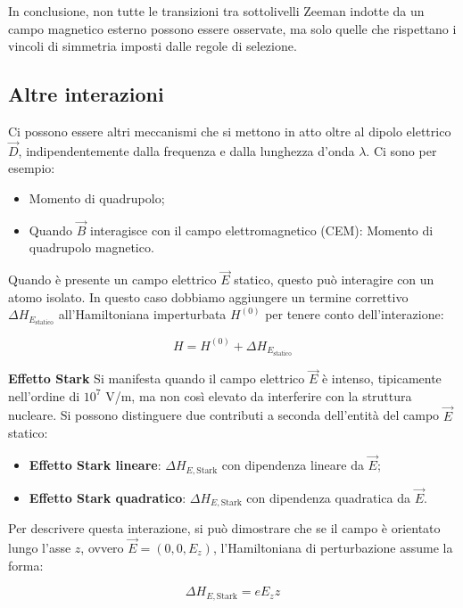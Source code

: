 In conclusione, non tutte le transizioni tra sottolivelli Zeeman indotte da un campo magnetico esterno possono essere osservate, ma solo quelle che rispettano i vincoli di simmetria imposti dalle regole di selezione.

\subsection{Altre interazioni}
Ci possono essere altri meccanismi che si mettono in atto oltre al dipolo elettrico \(\vec{D}\), indipendentemente dalla frequenza e dalla lunghezza d'onda \(\lambda\). Ci sono per esempio:
\begin{itemize}
    \item Momento di quadrupolo;
    \item Quando \(\vec{B}\) interagisce con il campo elettromagnetico (CEM): Momento di quadrupolo magnetico.
\end{itemize}

Quando è presente un campo elettrico \(\vec{E}\) statico, questo può interagire con un atomo isolato. In questo caso dobbiamo aggiungere un termine correttivo \(\Delta H_{E_{\text{statico}}}\) all'Hamiltoniana imperturbata \(H^{(0)}\) per tenere conto dell'interazione:

\begin{equation}
    H = H^{(0)} + \Delta H_{E_{\text{statico}}}
\end{equation}

\textbf{Effetto Stark}
Si manifesta quando il campo elettrico \(\vec{E}\) è intenso, tipicamente nell'ordine di \(10^7\) V/m, ma non così elevato da interferire con la struttura nucleare. Si possono distinguere due contributi a seconda dell'entità del campo \(\vec{E}\) statico:

\begin{itemize}
    \item \textbf{Effetto Stark lineare}: \(\Delta H_{E, \text{Stark}}\) con dipendenza lineare da \(\vec{E}\);
    \item \textbf{Effetto Stark quadratico}: \(\Delta H_{E, \text{Stark}}\) con dipendenza quadratica da \(\vec{E}\).
\end{itemize}

Per descrivere questa interazione, si può dimostrare che se il campo è orientato lungo l'asse \(z\), ovvero \(\vec{E} = (0, 0, E_z)\), l'Hamiltoniana di perturbazione assume la forma:

\begin{equation}
    \Delta H_{E, \text{Stark}} = e E_z z
\end{equation}

